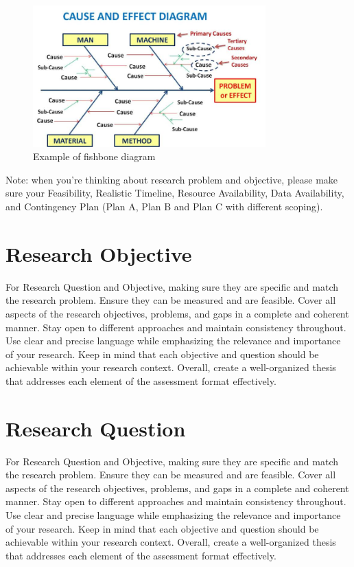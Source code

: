 	\begin{figure}[htbp]
		\centering 
		\includegraphics[width=0.8\textwidth]{images/fishbone.png}
		\caption{Example of fishbone diagram}
		\label{fig:fishbone}
	\end{figure} 

	Note: when you’re thinking about research problem and objective, please make sure your Feasibility, Realistic Timeline, Resource Availability, Data Availability, and Contingency Plan (Plan A, Plan B and Plan C with different scoping).

	\section{Research Objective}
	\label{sec:research-objective}	
	For Research Question and Objective, making sure they are specific and match the research problem. Ensure they can be measured and are feasible. Cover all aspects of the research objectives, problems, and gaps in a complete and coherent manner. Stay open to different approaches and maintain consistency throughout. Use clear and precise language while emphasizing the relevance and importance of your research. Keep in mind that each objective and question should be achievable within your research context. Overall, create a well-organized thesis that addresses each element of the assessment format effectively.
    
	\section{Research Question}
	\label{sec:research-question}
	For Research Question and Objective, making sure they are specific and match the research problem. Ensure they can be measured and are feasible. Cover all aspects of the research objectives, problems, and gaps in a complete and coherent manner. Stay open to different approaches and maintain consistency throughout. Use clear and precise language while emphasizing the relevance and importance of your research. Keep in mind that each objective and question should be achievable within your research context. Overall, create a well-organized thesis that addresses each element of the assessment format effectively.
    	
